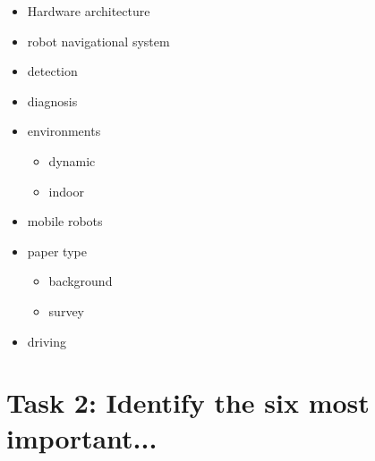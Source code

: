 \documentclass{article}
\begin{document}
\begin{itemize}
\begin{itemize}
    \end{itemize} 
    \item Hardware architecture
    \item robot navigational system
    \item detection
    \item diagnosis
    \item environments
    \begin{itemize}
        \item dynamic
        \item indoor
    \end{itemize}
    \item mobile robots
    \item paper type
    \begin{itemize}
        \item background
        \item survey
    \end{itemize}
    \item driving
\end{itemize}

\section*{Task 2: Identify the six most important...}
\end{document}
